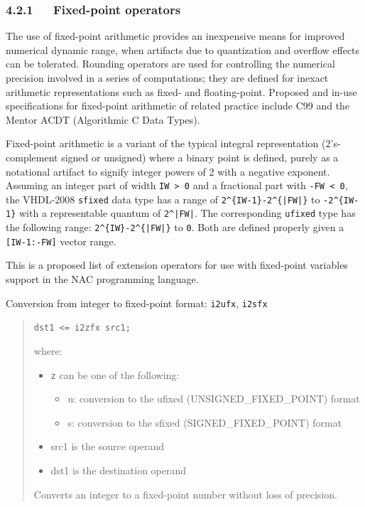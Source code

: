 \documentclass[a4paper]{article}
\begin{document}
\subsubsection{4.2.1~~~Fixed-point operators%
  \label{fixed-point-operators}%
}

The use of fixed-point arithmetic provides an inexpensive means for improved
numerical dynamic range, when artifacts due to quantization and overflow effects
can be tolerated. Rounding operators are used for controlling the numerical
precision involved in a series of computations; they are defined for
inexact arithmetic representations such as fixed- and floating-point.
Proposed and in-use specifications for fixed-point arithmetic of
related practice include C99 and the Mentor ACDT (Algorithmic C Data Types).

Fixed-point arithmetic is a variant of the typical integral representation
(2's-complement signed or unsigned) where a binary point is defined, purely
as a notational artifact to signify integer powers of 2 with a negative exponent.
Assuming an integer part of width \texttt{IW > 0} and a fractional part with
\texttt{-FW < 0}, the VHDL-2008 \texttt{sfixed} data type has a range of
\texttt{2\textasciicircum{}\{IW-1\}-2\textasciicircum{}\{|FW|\}} to \texttt{-2\textasciicircum{}\{IW-1\}} with a representable quantum of
\texttt{2\textasciicircum{}|FW|}. The corresponding \texttt{ufixed} type has the following range:
\texttt{2\textasciicircum{}\{IW\}-2\textasciicircum{}\{|FW|\}} to \texttt{0}. Both are defined properly given a \texttt{{[}IW-1:-FW{]}}
vector range.

This is a proposed list of extension operators for use with
fixed-point variables support in the NAC programming language.

Conversion from integer to fixed-point format: \texttt{i2ufx}, \texttt{i2sfx}
%
\begin{quote}

\texttt{dst1 <= i2zfx src1;}

where:
%
\begin{itemize}

\item \texttt{z} can be one of the following:
%
\begin{itemize}

\item u: conversion to the ufixed (UNSIGNED\_FIXED\_POINT) format

\item s: conversion to the sfixed (SIGNED\_FIXED\_POINT) format

\end{itemize}

\item src1 is the source operand

\item dst1 is the destination operand

\end{itemize}

Converts an integer to a fixed-point number without loss of precision.

\end{quote}
\end{document}
